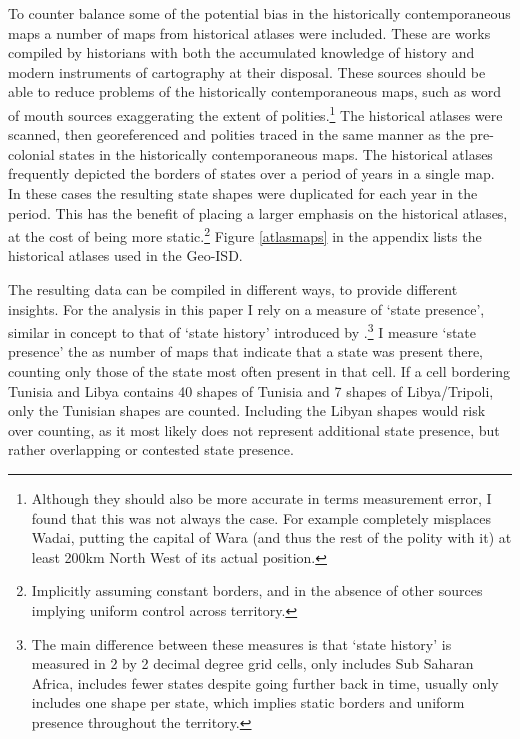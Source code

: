 \documentclass[12pt]{article}
\begin{document}

To counter balance some of the potential bias in the historically
contemporaneous maps a number of maps from historical atlases were included.
These are works compiled by historians with both the accumulated knowledge of
history and modern instruments of cartography at their disposal. These sources
should be able to reduce problems of the historically contemporaneous maps, such
as word of mouth sources exaggerating the extent of polities.\footnote{Although
	they should also be more accurate in terms measurement error, I found
that this was not always the case. For example \citep{Kasule1998} completely
misplaces Wadai, putting the capital of Wara (and thus the rest of the polity
with it) at least 200km North West of its actual position.} The historical
atlases were scanned, then georeferenced and polities traced in the same manner
as the pre-colonial states in the historically contemporaneous maps. The
historical atlases frequently depicted the borders of states over a period of
years in a single map. In these cases the resulting state shapes were duplicated
for each year in the period. This has the benefit of placing a larger emphasis
on the historical atlases, at the cost of being more static.\footnote{Implicitly
assuming constant borders, and in the absence of other sources implying uniform
control across territory.} Figure \ref{atlasmaps} in the appendix lists the
historical atlases used in the Geo-ISD.

The resulting data can be compiled in different ways, to provide different
insights. For the analysis in this paper I rely on a measure of `state
presence', similar in concept to that of `state history' introduced by
\citet{Depetris-Chauvin2016}.\footnote{The main difference between these
	measures is that `state history' is measured in 2 by 2 decimal degree
	grid cells, only includes Sub Saharan Africa, includes fewer states
	despite going further back in time, usually only includes one shape per
state, which implies static borders and uniform presence throughout the
territory.} I measure `state presence' the as number of maps that indicate that
a state was present there, counting only those of the state most often present
in that cell. If a cell bordering Tunisia and Libya contains 40 shapes of
Tunisia and 7 shapes of Libya/Tripoli, only the Tunisian shapes are counted.
Including the Libyan shapes would risk over counting, as it most likely does not
represent additional state presence, but rather overlapping or contested state
presence. 
\end{document}
